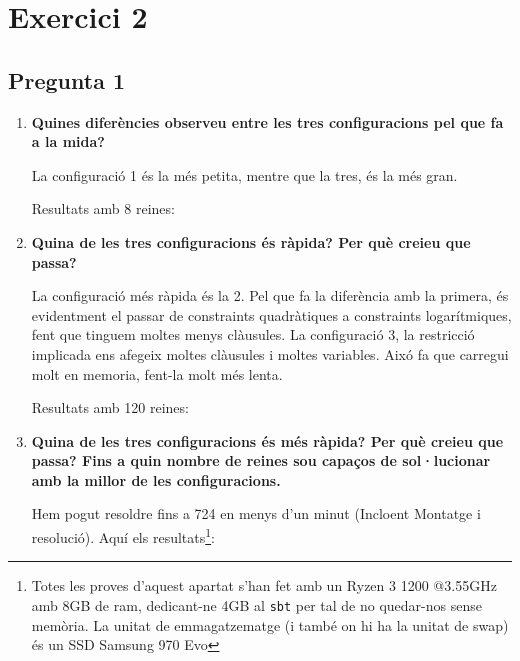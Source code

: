 \documentclass[11pt,a4paper,twoside]{report}
\begin{document}
\section{Exercici 2}

\subsection{Pregunta 1}
\begin{enumerate}
\item \textbf{Quines diferències observeu entre les tres configuracions pel que fa a la mida?}

La configuració 1 és la més petita, mentre que la tres, és la més gran.

Resultats amb 8 reines:

\small{}

\item \textbf{Quina de les tres configuracions és ràpida? Per què creieu que passa?}

La configuració més ràpida és la 2. Pel que fa la diferència amb la primera, és evidentment el passar de constraints quadràtiques a constraints logarítmiques, fent que tinguem moltes menys clàusules.
La configuració 3, la restricció implicada ens afegeix moltes clàusules i moltes variables. Aixó fa que carregui molt en memoria, fent-la molt més lenta.

Resultats amb 120 reines:

\small{}


\item \textbf{ Quina de les tres configuracions és més ràpida? Per què creieu que passa? Fins a quin nombre de reines sou capaços de sol·lucionar amb la millor de les configuracions.}

Hem pogut resoldre fins a 724 en menys d'un minut (Incloent Montatge i resolució). Aquí els resultats\footnote{Totes les proves d'aquest apartat s'han fet amb un Ryzen 3 1200 @3.55GHz amb 8GB de ram, dedicant-ne 4GB al \texttt{sbt} per tal de no quedar-nos sense memòria. La unitat de emmagatzematge (i també on hi ha la unitat de swap) és un SSD Samsung 970 Evo}:

\small{}



\end{enumerate}
\end{document}
